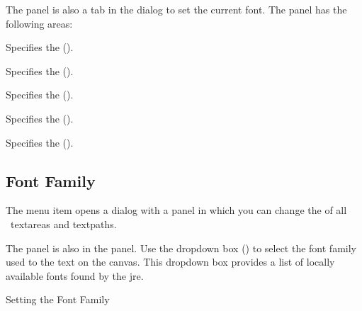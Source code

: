 The  panel is also a tab
in the  dialog to set the current
\gls{font}. The panel has the following areas:
\begin{deflist}
\begin{itemdesc}
Specifies the  ().
\end{itemdesc}

\begin{itemdesc}
Specifies the  ().
\end{itemdesc}

\begin{itemdesc}
Specifies the  ().
\end{itemdesc}

\begin{itemdesc}
Specifies the  ().
\end{itemdesc}

\begin{itemdesc}
Specifies the  ().
\end{itemdesc}

\end{deflist}

\subsection{Font Family}\label{sec:fontfamily}


The  menu item opens a dialog with a 
 panel in which you can change the
of all \selected\ \glspl{textarea} and \glspl{textpath}.


The  panel is also in the 
panel. Use the dropdown box () to
select the font family used to  the
text on the \gls{canvas}.  This dropdown box provides a list of
locally available fonts found by the \gls{jre}.

{}
{Setting the Font Family}


